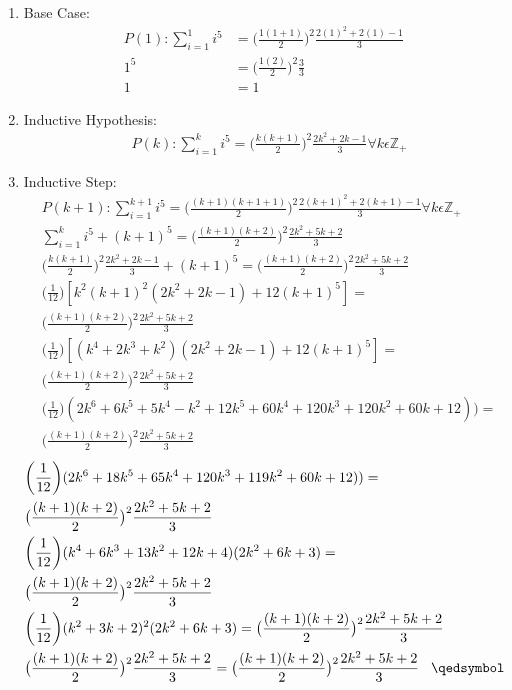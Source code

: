 \documentclass[12pt]{article}
\begin{document}
\begin{enumerate}
\item Base Case:\\
\begin{align*}
P(1):\sum\limits_{i = 1}^{1} i^5 &= \big(\frac{1(1 + 1)}{2}\big)^2\frac{2(1)^2+2(1)-1}{3}\\
1^5 &= \big(\frac{1(2)}{2}\big)^2\frac{3}{3}\\
1 &= 1
\end{align*}

\item Inductive Hypothesis:
\begin{align*}
&P(k):\sum\limits_{i = 1}^{k} i^5 = \big(\frac{k(k + 1)}{2}\big)^2\frac{2k^2+2k-1}{3} \forall k \epsilon \mathbb{Z}_+
\end{align*}
\item Inductive Step:
\begin{align*}
&P(k+1):\sum\limits_{i = 1}^{k+1} i^5 = \big(\frac{(k+1)(k + 1 + 1)}{2}\big)^2\frac{2(k+1)^2+2(k+1)-1}{3} \forall k \epsilon \mathbb{Z}_+ \\
&\sum\limits_{i = 1}^{k} i^5 + (k + 1)^5 = \big(\frac{(k+1)(k + 2)}{2}\big)^2\frac{2k^2+5k+2}{3}\\
&\bigg(\frac{k(k + 1)}{2}\bigg)^2\frac{2k^2+2k-1}{3} + (k + 1)^5 = \big(\frac{(k+1)(k + 2)}{2}\big)^2\frac{2k^2+5k+2}{3}\\
&\bigg(\frac{1}{12}\bigg)[k^2(k+1)^2(2k^2+2k-1)+12(k+1)^5]= \\& \big(\frac{(k+1)(k + 2)}{2}\big)^2\frac{2k^2+5k+2}{3}\\
&\bigg(\frac{1}{12}\bigg)[(k^4+2k^3+k^2)(2k^2+2k-1)+12(k+1)^5]=\\& \big(\frac{(k+1)(k + 2)}{2}\big)^2\frac{2k^2+5k+2}{3}\\
&\bigg(\frac{1}{12}\bigg)(2k^6+6k^5+5k^4-k^2+12k^5+60k^4+120k^3+120k^2+60k+12))=\\& \big(\frac{(k+1)(k + 2)}{2}\big)^2\frac{2k^2+5k+2}{3}
\end{align*}
\begin{align*}
&\bigg(\frac{1}{12}\bigg)(2k^6+18k^5+65k^4+120k^3+119k^2+60k+12))=\\& \big(\frac{(k+1)(k + 2)}{2}\big)^2\frac{2k^2+5k+2}{3}\\
&\bigg(\frac{1}{12}\bigg)(k^4+6k^3+13k^2+12k+4)(2k^2+6k+3)=\\& \big(\frac{(k+1)(k + 2)}{2}\big)^2\frac{2k^2+5k+2}{3}\\
&\bigg(\frac{1}{12}\bigg)(k^2+3k+2)^2(2k^2+6k+3)= \big(\frac{(k+1)(k + 2)}{2}\big)^2\frac{2k^2+5k+2}{3}\\
&\big(\frac{(k+1)(k + 2)}{2}\big)^2\frac{2k^2+5k+2}{3}= \big(\frac{(k+1)(k + 2)}{2}\big)^2\frac{2k^2+5k+2}{3}\hspace{0.3cm}\qedsymbol
\end{align*}
\end{enumerate}
\end{document}
